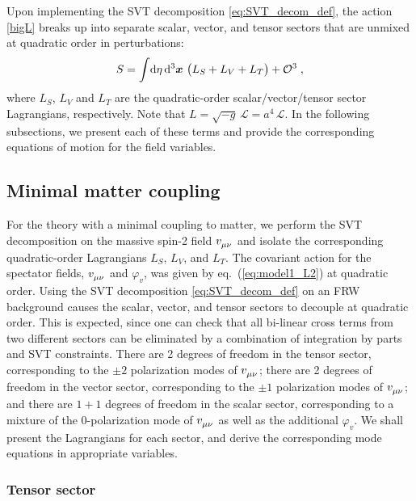 \documentclass[11pt,a4paper]{article}
\newcommand{\ba}[1]{\begin{align} #1 \end{align}}
\newcommand{\xvec}{{\bm x}}
\newcommand{\Lcal}{\mathcal{L}}
\newcommand{\LT}{L_T}
\newcommand{\LV}{L_V}
\newcommand{\LS}{L_S}
\newcommand{\eref}[1]{eq.~(\ref{#1})}
\begin{document}
Upon implementing the SVT decomposition \eqref{eq:SVT_decom_def}, the action \eqref{bigL} breaks up into separate scalar, vector, and tensor sectors that are unmixed at quadratic order in perturbations: 
\ba{\label{eq:S_to_LS_LV_LT}
    S = \int \! \dd{\eta} \dd[3]{\xvec} \, \bigl( \LS + \LV + \LT \bigr) + {\cal O}^3
    \;,
}
where $\LS$, $\LV$ and $\LT$ are the quadratic-order scalar/vector/tensor sector Lagrangians, respectively. 
Note that $L = \sqrt{-g} \, \Lcal = a^4 \, \Lcal$.  In the following subsections, we present each of these terms and provide the corresponding equations of motion for the field variables.  

\subsection{Minimal matter coupling}
\label{sub:minimal_matter_SVT}

For the theory with a minimal coupling to matter, we perform the SVT decomposition on the massive spin-2 field $v\indices{_\mu_\nu}$ and isolate the corresponding quadratic-order Lagrangians $\LS$, $\LV$, and $\LT$.  The covariant action for the spectator fields, $v\indices{_\mu_\nu}$ and $\varphi_v$, was given by \eref{eq:model1_L2} at quadratic order. Using the SVT decomposition \eqref{eq:SVT_decom_def} on an FRW background causes the scalar, vector, and tensor sectors to decouple at quadratic order.  This is expected, since one can check that all bi-linear cross terms from two different sectors can be eliminated by a combination of integration by parts and SVT constraints. There are 2 degrees of freedom in the tensor sector, corresponding to the $\pm 2$ polarization modes of $v\indices{_\mu_\nu}$; there are 2 degrees of freedom in the vector sector, corresponding to the $\pm 1$ polarization modes of $v\indices{_\mu_\nu}$; and there are $1+1$ degrees of freedom in the scalar sector, corresponding to a mixture of the $0$-polarization mode of $v\indices{_\mu_\nu}$ as well as the additional $\varphi_v$. We shall present the Lagrangians for each sector, and derive the corresponding mode equations in appropriate variables.

\subsubsection{Tensor sector}
\label{sub:model1_tensor_sector}
\end{document}
